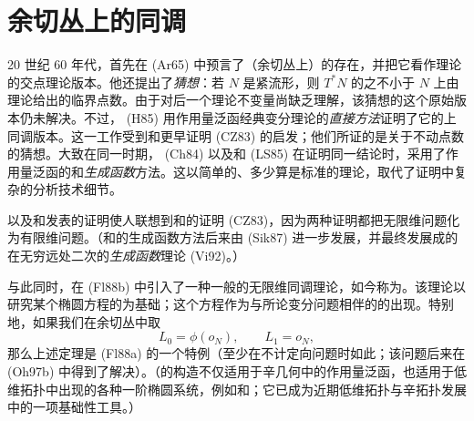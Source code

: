 \chapter{余切丛上的\personFloer{}同调}
\label{ch:cotangent-floer}

20 世纪 60 年代，\personArnold{}首先在 (Ar65) 中预言了（余切丛上）\emph{\termLagrangianIntersectionTheory{}}的存在，并把它看作\personMorse{}理论的交点理论版本。他还提出了\emph{\personArnold{}猜想}：若 $N$ 是紧流形，则 $T^*N$ 的\termZeroSection{}之\termGeometricIntersectionNumber{}不小于 $N$ 上由\personMorse{}理论给出的临界点数。由于对后一个\personMorse{}理论不变量尚缺乏理解，该猜想的这个原始版本仍未解决。不过，\personHofer{} (H85) 用作用量泛函经典变分理论的\emph{直接方法}证明了它的上同调版本。这一工作受到\personConley{}和\personZehnder{}更早证明 (CZ83) 的启发；他们所证的是关于\termHamiltonianDiffeomorphism{}不动点数的\personArnold{}猜想。大致在同一时期，\personMarcChaperon{} (Ch84) 以及\personLaudenbach{}和\personSikorav{} (LS85) 在证明同一结论时，采用了作用量泛函的\emph{\termBrokenGeodesicApproximation{}}和\emph{生成函数}方法。这以简单的、多少算是标准的\personMorse{}理论，取代了\personHofer{}证明中复杂的分析技术细节。

\personChaperon{}以及\personLaudenbach{}和\personSikorav{}发表的证明使人联想到\personConley{}和\personZehnder{}的证明 (CZ83)，因为两种证明都把无限维问题化为有限维问题。（\personLaudenbach{}和\personSikorav{}的生成函数方法后来由\personSikorav{} (Sik87) 进一步发展，并最终发展成\personViterbo{}的在无穷远处二次的\emph{生成函数}理论 (Vi92)。）

与此同时，\personFloer{}在 (Fl88b) 中引入了一种一般的无限维同调理论，如今称为\termFloerHomology{}。该理论以研究某个\termCauchyRiemannType{}椭圆方程的\termModuliSpace{}为基础；这个方程作为与所论变分问题相伴的\termActionIntegral{}的\termLtwoGradientFlow{}出现。特别地，如果我们在余切丛中取
\[
  L_0=\phi(o_N),\qquad L_1=o_N,
\]
那么上述\personHofer{}定理是\personFloer{} (Fl88a) 的一个特例（至少在不计定向问题时如此；该问题后来在 (Oh97b) 中得到了解决）。（\personFloer{}的构造不仅适用于辛几何中的作用量泛函，也适用于低维拓扑中出现的各种一阶椭圆系统，例如\termAntiSelfDualYangMillsEquation{}和\termSeibergWittenMonopoleEquation{}；它已成为近期低维拓扑与辛拓扑发展中的一项基础性工具。）

